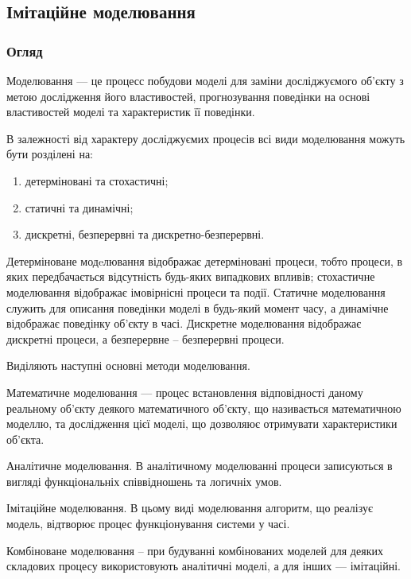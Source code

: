 \subsection{Імітаційне моделювання}
\subsubsection{Огляд}
Моделювання --- це процесс побудови моделі для заміни досліджуємого об’єкту з метою дослідження його властивостей, прогнозування поведінки на основі властивостей моделі та характеристик її поведінки\cite{model}.

В залежності від характеру досліджуємих процесів всі види моделювання можуть бути розділені на:
\begin{enumerate}
\item детерміновані та стохастичні;
\item статичні та динамічні;
\item дискретні, безперервні та дискретно-безперервні.
\end{enumerate}
 
Детерміноване модeлювання відображає детерміновані процеси, тобто процеси, в яких передбачається відсутність будь-яких випадкових впливів; стохастичне моделювання відображає імовірнісні процеси та події. Статичне моделювання служить для описання поведінки моделі в будь-який момент часу, а динамічне відображає поведінку об’єкту в часі. Дискретне моделювання відображає дискретні процеси, а безперервне -- безперервні процеси\cite{model}.

Виділяють наступні основні методи моделювання\cite{model}.
\begin{longEnumerate}
   \item Математичне моделювання --- процес встановлення відповідності даному реальному об’єкту деякого математичного об’єкту, що називається математичною моделлю, та дослідження цієї моделі, що дозволяює отримувати характеристики об’єкта. 
   \item Аналітичне моделювання. В аналітичному моделюванні процеси записуються в вигляді функціональніх співвідношень та логичніх умов.
   \item Імітаційне моделювання. В цьому виді моделювання алгоритм, що реалізує модель, відтворює процес функціонування системи у часі.
   \item Комбіноване моделювання -- при будуванні комбінованих моделей для деяких складових процесу використовують аналітичні моделі, а для інших --- імітаційні.
\end{longEnumerate}

